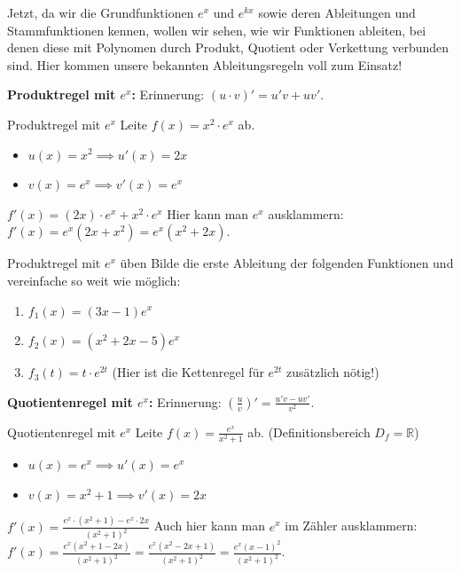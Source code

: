 Jetzt, da wir die Grundfunktionen $e^x$ und $e^{kx}$ sowie deren Ableitungen und Stammfunktionen kennen, wollen wir sehen, wie wir Funktionen ableiten, bei denen diese mit Polynomen durch Produkt, Quotient oder Verkettung verbunden sind. Hier kommen unsere bekannten Ableitungsregeln voll zum Einsatz!

\textbf{Produktregel mit $e^x$:}
Erinnerung: $(u \cdot v)' = u'v + uv'$.

\begin{beispielumgebung}{Produktregel mit $e^x$}
Leite $f(x) = x^2 \cdot e^x$ ab.
\begin{itemize}
    \item $u(x) = x^2 \implies u'(x) = 2x$
    \item $v(x) = e^x \implies v'(x) = e^x$
\end{itemize}
$f'(x) = (2x) \cdot e^x + x^2 \cdot e^x$
Hier kann man $e^x$ ausklammern:
$f'(x) = e^x (2x + x^2) = e^x (x^2 + 2x)$.
\end{beispielumgebung}

\begin{aufgabenumgebung}{Produktregel mit $e^x$ üben}
Bilde die erste Ableitung der folgenden Funktionen und vereinfache so weit wie möglich:
\begin{enumerate}
    \item $f_1(x) = (3x-1)e^x$
    \item $f_2(x) = (x^2+2x-5)e^x$
    \item $f_3(t) = t \cdot e^{2t}$ (Hier ist die Kettenregel für $e^{2t}$ zusätzlich nötig!)
\end{enumerate}
\end{aufgabenumgebung}

\textbf{Quotientenregel mit $e^x$:}
Erinnerung: $(\frac{u}{v})' = \frac{u'v - uv'}{v^2}$.

\begin{beispielumgebung}{Quotientenregel mit $e^x$}
Leite $f(x) = \frac{e^x}{x^2+1}$ ab. (Definitionsbereich $D_f = \mathbb{R}$)
\begin{itemize}
    \item $u(x) = e^x \implies u'(x) = e^x$
    \item $v(x) = x^2+1 \implies v'(x) = 2x$
\end{itemize}
$f'(x) = \frac{e^x \cdot (x^2+1) - e^x \cdot 2x}{(x^2+1)^2}$
Auch hier kann man $e^x$ im Zähler ausklammern:
$f'(x) = \frac{e^x (x^2+1 - 2x)}{(x^2+1)^2} = \frac{e^x (x^2-2x+1)}{(x^2+1)^2} = \frac{e^x (x-1)^2}{(x^2+1)^2}$.
\end{beispielumgebung}

